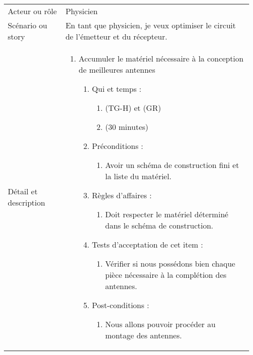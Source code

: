 \begin{longtable}{|l|p{}|}
\hline
    \rowcolor{Gray}
    \multicolumn{2}{|l|}{2} \\
\hline
    Acteur ou rôle & Physicien  \\
\hline
    Scénario ou story & En tant que physicien, je veux optimiser le circuit de l'émetteur et du récepteur. \\
\hline
    Détail et description &
        \begin{enumerate}[label*=\arabic*.]
            \item Accumuler le matériel nécessaire à la conception de meilleures antennes
            \begin{enumerate}[label*=\arabic*.]
                    \item Qui et temps :
                    \begin{enumerate}[label*=\arabic*.]
                        \item (TG-H) et (GR)
                        \item (30 minutes)
                    \end{enumerate}
                    \item Préconditions :
                    \begin{enumerate}[label*=\arabic*.]
                        \item Avoir un schéma de construction fini et la liste du matériel.
                    \end{enumerate}
                    \item Règles d’affaires :
                    \begin{enumerate}[label*=\arabic*.]
                        \item Doit respecter le matériel déterminé dans le schéma de construction.
                    \end{enumerate}
                    \item Tests d'acceptation de cet item :
                    \begin{enumerate}[label*=\arabic*.]
                        \item Vérifier si nous possédons bien chaque pièce nécessaire à la complétion des antennes.
                    \end{enumerate}
                    \item Post-conditions :
                    \begin{enumerate}[label*=\arabic*.]
                        \item Nous allons pouvoir procéder au montage des antennes.

\end{enumerate}
\end{enumerate}
\end{enumerate}
\end{longtable}
